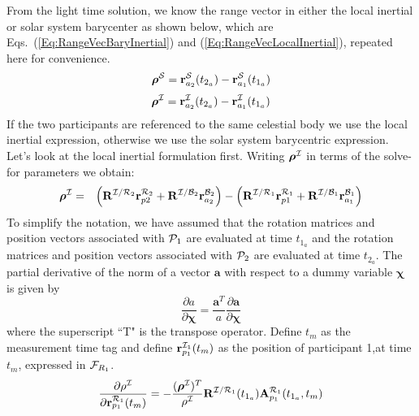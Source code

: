 From the light time solution, we know the range vector in either the local inertial or solar system barycenter as shown below, which are Eqs.~(\ref{Eq:RangeVecBaryInertial}) and (\ref{Eq:RangeVecLocalInertial}), repeated here for convenience.
%
 \begin{equation}
     \boldsymbol{\rho}^\mcS = \mathbf{r}_{a_{2}}^{\mcS}(t_{2_{a}}) - \mathbf{r}_{a_{1}}^{\mcS}(t_{1_{a}}) \nonumber
\end{equation}
%
\begin{equation}
     \boldsymbol{\rho}^\mcI =  \mathbf{r}_{a_{2}}^{\mcI}(t_{2_{a}}) - \mathbf{r}_{a_{1}}^{\mcI}(t_{1_{a}}) \nonumber
\end{equation}
%
If the two participants are referenced to the same celestial body we use the local inertial expression, otherwise we use the solar system barycentric expression.  Let's look at the local inertial formulation first.  Writing $\boldsymbol{\rho}^\mcI$   in terms of the solve-for parameters we obtain:
%
 \begin{eqnarray}
    \boldsymbol{\rho}^\mcI &=& \left(\mathbf{R}^{\mathcal{I}/\mathcal{R}_2}\mathbf{r}_{p2}^{\mathcal{R}_2} + \mathbf{R}^{\mathcal{I}/\mathcal{B}_2}\mathbf{r}_{a_{2}}^{\mathcal{B}_2} \right)  - \left( \mathbf{R}^{\mathcal{I}/\mathcal{R}_1}\mathbf{r}_{p1}^{\mathcal{R}_1} + \mathbf{R}^{\mathcal{I}/\mathcal{B}_1}\mathbf{r}_{a_{1}}^{\mathcal{B}_1}\right)
\end{eqnarray}
%
To simplify the notation, we have assumed that the rotation matrices and position vectors associated with $\mcP_1$ are evaluated at time $t_{1_a}$ and the rotation matrices and position vectors associated with $\mcP_2$ are evaluated at time $t_{2_a}$.  The partial derivative of the norm of a vector $\mathbf{a}$ with respect to a dummy variable $\boldsymbol{\chi}$ is given by
%
\begin{equation}
   \frac{\partial a}{\partial \boldsymbol{\chi}} = \frac{\mathbf{a}^T}{a}\frac{\partial \mathbf{a}}{\partial \boldsymbol{\chi}}
\end{equation}
%
where the superscript ``T" is the transpose operator. Define $t_m$ as the measurement time tag and define $\mathbf{r}^{\mcI_1}_{p_{1}}(t_m)$  as the position of participant 1,at time $t_m$, expressed in $\mcF_{R_1}$.
%
\begin{equation}
   \frac{\partial \rho^\mcI}{\partial \mathbf{r}^{\mcR_1}_{p_{1}}(t_m)} = - \frac{(\boldsymbol{\rho}^\mcI)^T}{\rho^\mcI}\mathbf{R}^{\mathcal{I}/\mathcal{R}_1}(t_{1_a})\mathbf{A}_{p_1}^{\mcR_1}(t_{1_a},t_m) \label{Eq:InertialDistancePartial1}
\end{equation}
